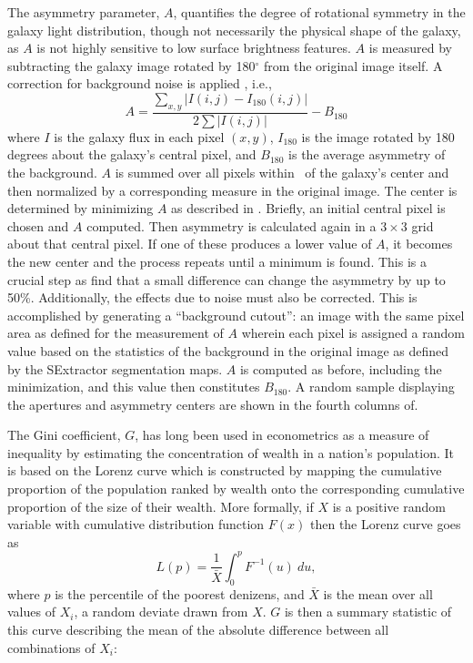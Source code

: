 The asymmetry parameter, $A$, quantifies the degree of rotational symmetry in the galaxy light distribution, though not necessarily the physical shape of the galaxy, as $A$ is not highly sensitive to low surface brightness features. $A$ is measured by subtracting the galaxy image rotated by 180$^{\circ}$ from the original image itself. A correction for background noise is applied \citep[as in e.g.,][]{Conselice2000, Lotz2004}, i.e., 
\begin{equation}\label{eqn: asymmetry}
A = \frac{\sum_{x,y} |I(i,j) - I_{180}(i,j)|}{ 2\sum|I(i,j)|} - B_{180}
\end{equation}
where $I$ is the galaxy flux in each pixel $(x, y)$, $I_{180}$ is the image rotated by 180 degrees about the galaxy's central pixel, and $B_{180}$ is the average asymmetry of the background. $A$ is summed over all pixels within \rp~of the galaxy's center and then normalized by a corresponding measure in the original image. The center is determined by minimizing $A$ as described in \cite{Conselice2000}. Briefly, an initial central pixel is chosen and $A$ computed. Then asymmetry is calculated again in a $3\times3$ grid about that central pixel. If one of these produces a lower value of $A$, it becomes the new center and the process repeats until a minimum is found. This is a crucial step as \cite{Conselice2000} find that a small difference can change the asymmetry by up to 50\%. Additionally, the effects due to noise must also be corrected. This is accomplished by generating a ``background cutout'': an image with the same pixel area as defined for the measurement of $A$ wherein each pixel is assigned a random value based on the statistics of the background in the original image as defined by the SExtractor segmentation maps. $A$ is computed as before, including the minimization, and this value then constitutes $B_{180}$. A random sample displaying the apertures and asymmetry centers are shown in the fourth columns of. 

The Gini coefficient, $G$, has long been used in econometrics as a measure of inequality by estimating the concentration of wealth in a nation's population. It is based on the Lorenz curve \citep{Lorenz1905} which is constructed by mapping the cumulative proportion of the population ranked by wealth onto the corresponding cumulative proportion of the size of their wealth. More formally, if $X$ is a positive random variable with cumulative distribution function $F(x)$ then the Lorenz curve goes as   
\begin{equation}
L(p) = \frac{1}{\bar X}\int^p_0 F^{-1}(u)~du,
\end{equation}
where $p$ is the percentile of the poorest denizens, and $\bar X$ is the mean over all values of $X_i$, a random deviate drawn from $X$. $G$ is then a summary statistic of this curve describing the mean of the absolute difference between all combinations of $X_i$:

